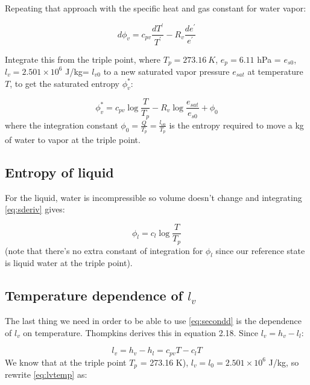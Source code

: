 \documentclass[12pt]{article}
\begin{document}
Repeating that approach with the specific heat and gas constant for water vapor:

\begin{equation}
\label{eq:sderiv}
  d\phi_v  = c_{pv}    \frac{dT^\prime}{T^\prime} -   R_v\frac{ de^\prime}{e^\prime} 
\end{equation}

Integrate this from the triple point, where $T_p=273.16\ K$, $e_p = 6.11$ hPa
= $e_{s0}$,  $l_v=2.501 \times 10^6$ J/kg= $l_{v0}$ to a new saturated vapor pressure
$e_{sat}$ at temperature $T$, to get the saturated entropy $\phi_v^*$:

\begin{equation}
  \label{eq:int}
\phi_v^* = c_{pv} \log \frac{T }{T_p} - R_v \log \frac{ e_{sat} }{e_{s0}} + \phi_0
\end{equation}
where the integration constant $\phi_0 = \frac{Q }{T_p}  = \frac{l_{v0} }{T_p}$ is the
entropy required to move a kg of water to vapor at the triple point.

\subsection{Entropy of liquid}
\label{sec:entropy-liquid}

For the liquid, water is incompressible so volume doesn't change and integrating \eqref{eq:sderiv} gives:

\begin{equation}
\label{eq:sl}
  \phi_l = c_l \log \frac{T }{T_p} 
\end{equation}
(note that there's no extra constant of integration for $\phi_l$ since our reference state is liquid water
at the triple point).

\subsection{Temperature dependence of $l_v$}
\label{sec:temp-depend-l_v}

The last thing we need in order to be able to use \eqref{eq:secondd} is the dependence of $l_v$ on temperature.
Thompkins derives this in equation 2.18.  Since $l_v = h_v - l_l$:

\begin{equation}
  \label{eq:lvtemp}
  l_v = h_v - h_l = c_{pv}T  - c_l T
\end{equation}
We know that at the triple point $T_p$ = 273.16 K), $l_v = l_0 = 2.501 \times 10^{6}$ J/kg, so rewrite \eqref{eq:lvtemp} as:
\end{document}
